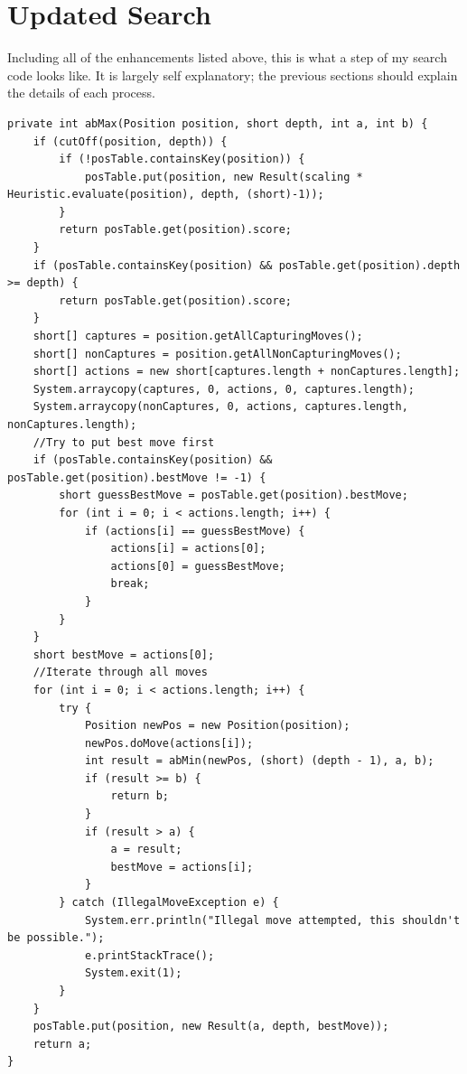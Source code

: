 \documentclass[10pt]{article}
\begin{document}
\section{Updated Search}

Including all of the enhancements listed above, this is what a step of my search code looks like. It is largely self explanatory; the previous sections should explain the details of each process.

\begin{lstlisting}
private int abMax(Position position, short depth, int a, int b) {
	if (cutOff(position, depth)) {
		if (!posTable.containsKey(position)) {
			posTable.put(position, new Result(scaling * Heuristic.evaluate(position), depth, (short)-1));
		} 
		return posTable.get(position).score;
	}
	if (posTable.containsKey(position) && posTable.get(position).depth >= depth) {
		return posTable.get(position).score;
	}
	short[] captures = position.getAllCapturingMoves();
	short[] nonCaptures = position.getAllNonCapturingMoves();
	short[] actions = new short[captures.length + nonCaptures.length];
	System.arraycopy(captures, 0, actions, 0, captures.length);
	System.arraycopy(nonCaptures, 0, actions, captures.length, nonCaptures.length);
	//Try to put best move first
	if (posTable.containsKey(position) && posTable.get(position).bestMove != -1) { 
		short guessBestMove = posTable.get(position).bestMove;
		for (int i = 0; i < actions.length; i++) {
			if (actions[i] == guessBestMove) {
				actions[i] = actions[0];
				actions[0] = guessBestMove;
				break;
			}
		}
	}
	short bestMove = actions[0];
	//Iterate through all moves
	for (int i = 0; i < actions.length; i++) {
		try {
			Position newPos = new Position(position);
			newPos.doMove(actions[i]);
			int result = abMin(newPos, (short) (depth - 1), a, b);
			if (result >= b) {
				return b;
			}
			if (result > a) {
				a = result;
				bestMove = actions[i];
			}
		} catch (IllegalMoveException e) {
			System.err.println("Illegal move attempted, this shouldn't be possible.");
			e.printStackTrace();
			System.exit(1);
		}
	}
	posTable.put(position, new Result(a, depth, bestMove));
	return a;
}
\end{lstlisting}
\end{document}
